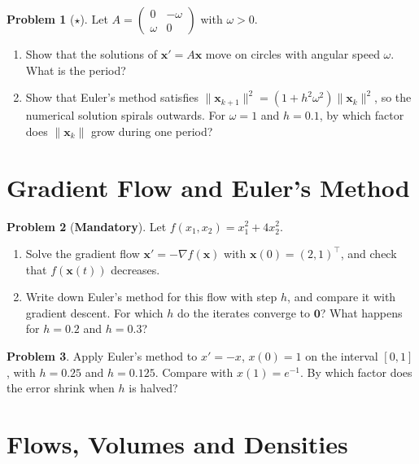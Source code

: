 \documentclass[11pt]{article}
\theoremstyle{definition}
\newtheorem{problem}{Problem}[section]
\newcommand{\mandatory}{\textcolor{red!70!black}{\textbf{Mandatory}}}
\newcommand{\norm}[1]{\lVert #1 \rVert}
\begin{document}
\begin{problem}[$\star$]\label{pr:rotation-ode}
    Let $A = \begin{pmatrix} 0 & -\omega \\ \omega & 0 \end{pmatrix}$ with $\omega > 0$.
    \begin{enumerate}[label=(\alph*)]
        \item Show that the solutions of $\mathbf{x}' = A\mathbf{x}$ move on circles with angular speed $\omega$. What is the period?
        \item Show that Euler's method satisfies $\norm{\mathbf{x}_{k+1}}^2 = (1 + h^2\omega^2)\norm{\mathbf{x}_k}^2$, so the numerical solution spirals outwards. For $\omega = 1$ and $h = 0.1$, by which factor does $\norm{\mathbf{x}_k}$ grow during one period?
    \end{enumerate}
\end{problem}

\section{Gradient Flow and Euler's Method}

\begin{problem}[\mandatory]\label{pr:gradient-flow}
    Let $f(x_1, x_2) = x_1^2 + 4x_2^2$.
    \begin{enumerate}[label=(\alph*)]
        \item Solve the gradient flow $\mathbf{x}' = -\nabla f(\mathbf{x})$ with $\mathbf{x}(0) = (2, 1)^\top$, and check that $f(\mathbf{x}(t))$ decreases.
        \item Write down Euler's method for this flow with step $h$, and compare it with gradient descent. For which $h$ do the iterates converge to $\mathbf{0}$? What happens for $h = 0.2$ and $h = 0.3$?
    \end{enumerate}
\end{problem}

\begin{problem}\label{pr:euler-error}
    Apply Euler's method to $x' = -x$, $x(0) = 1$ on the interval $[0, 1]$, with $h = 0.25$ and $h = 0.125$. Compare with $x(1) = e^{-1}$. By which factor does the error shrink when $h$ is halved?
\end{problem}

\section{Flows, Volumes and Densities}
\end{document}
